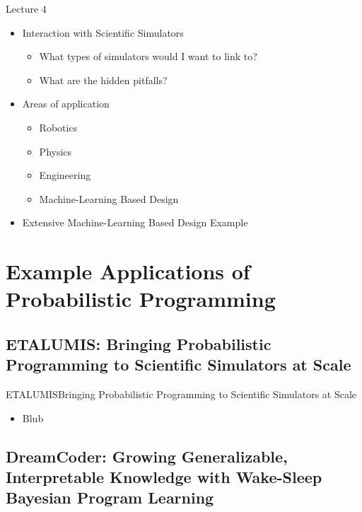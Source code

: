 \documentclass[AERbeamer%
              ,optEnglish%
              ,optBiber%
              ,optBibstyleAlphabetic%
              ,optBeamerClassicFormat%
              ]{AERlatex}%
\begin{document}
\begin{frame}[c]{Lecture 4}
    \centering
    \begin{itemize}
        \item Interaction with Scientific Simulators
        \begin{itemize}
            \item What types of simulators would I want to link to?
            \item What are the hidden pitfalls?
        \end{itemize}
        \item Areas of application
        \begin{itemize}
            \item Robotics
            \item Physics
            \item Engineering
            \item Machine-Learning Based Design
        \end{itemize}
        \item Extensive Machine-Learning Based Design Example
    \end{itemize}
\end{frame}



\section{Example Applications of Probabilistic Programming}


\subsection{ETALUMIS: Bringing Probabilistic Programming to Scientific Simulators at Scale}

\begin{frame}[c]{ETALUMIS}{Bringing Probabilistic Programming to Scientific Simulators at Scale}
    \centering
    \begin{itemize}
        \item Blub
    \end{itemize}
\end{frame}



\subsection{DreamCoder: Growing Generalizable, Interpretable Knowledge with Wake-Sleep Bayesian Program Learning}
\end{document}
